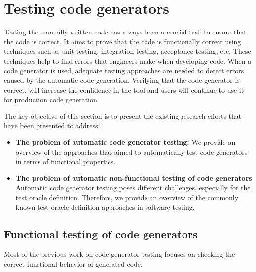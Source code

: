 \section{Testing code generators}
\label{sec:Testing code generators}
Testing the manually written code has always been a crucial task to ensure that the code is correct. It aims to prove that the code is functionally correct using techniques such as unit testing, integration testing, acceptance testing, etc. These techniques help to find errors that engineers make when developing code.
When a code generator is used, adequate testing approaches are needed to detect errors caused by the automatic code generation. Verifying that the code generator is correct, will increase the confidence in the tool and users will continue to use it for production code generation. 

The key objective of this section is to present the existing research efforts that have been presented to address:
\begin{itemize}
	\item \textbf{The problem of automatic code generator testing:}  We provide an overview of the approaches that aimed to automatically test code generators in terms of functional properties.
	
	\item \textbf{The problem of automatic non-functional testing of code generators} Automatic code generator testing poses different challenges, especially for the test oracle definition. Therefore, we provide an overview of the commonly known test oracle definition approaches in software testing. 
\end{itemize}

\subsection{Functional testing of code generators}
\label{sec: Functional testing of code generators}

Most of the previous work on code generator testing focuses on checking the correct functional behavior of generated code\cite{stuermer2007systematic,zelenov2006automatic,conrad2009testing,conrad2010code,jorges2014back,burnard2004verifying,sturmer2003test}. 

